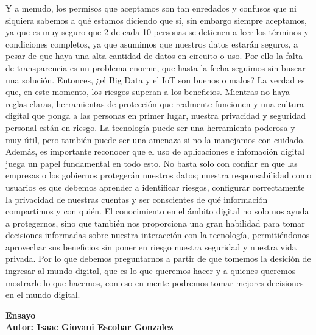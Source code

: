 \documentclass[12pt]{report}
\begin{document}
\begin{enumerate}[label=\textbf{\arabic*.}, leftmargin=*]
\begin{enumerate}[label=\textbf{\alph*.}, leftmargin=*, itemsep=1.0em]
Y a menudo, los permisos que aceptamos son tan enredados y confusos que ni siquiera sabemos a qué estamos diciendo que sí, sin embargo siempre aceptamos, ya que es muy seguro que 2 de cada 10 personas se detienen a leer los términos y condiciones completos, ya que asumimos que nuestros datos estarán seguros, a pesar de que haya una alta cantidad de datos en circuito o uso. Por ello la falta de transparencia es un problema enorme, que hasta la fecha seguimos sin buscar una solución.
Entonces, ¿el Big Data y el IoT son buenos o malos? La verdad es que, en este momento, los riesgos superan a los beneficios. Mientras no haya reglas claras, herramientas de protección que realmente funcionen y una cultura digital que ponga a las personas en primer lugar, nuestra privacidad y seguridad personal están en riesgo. La tecnología puede ser una herramienta poderosa y muy útil, pero también puede ser una amenaza si no la manejamos con cuidado.\\

Además, es importante reconocer que el uso de aplicaciones e infomaci\'on digital juega un papel fundamental en todo esto. No basta solo con confiar en que las empresas o los gobiernos protegerán nuestros datos; nuestra responsabilidad como usuarios es que debemos aprender a identificar riesgos, configurar correctamente la privacidad de nuestras cuentas y ser conscientes de qué información compartimos y con quién. El conocimiento en el ámbito digital no solo nos ayuda a protegernos, sino que también nos proporciona una gran habilidad para tomar decisiones informadas sobre nuestra interacción con la tecnología, permitiéndonos aprovechar sus beneficios sin poner en riesgo nuestra seguridad y nuestra vida privada. Por lo que debemos preguntarnos a partir de que tomemos la desici\'on de ingresar al mundo digital, que es lo que queremos hacer y a quienes queremos mostrarle lo que hacemos, con eso en mente podremos tomar mejores decisiones en el mundo digital.


\newpage
\textbf{Ensayo\\
        Autor: Isaac Giovani Escobar Gonzalez}


\end{enumerate}
\end{enumerate}
\end{document}
